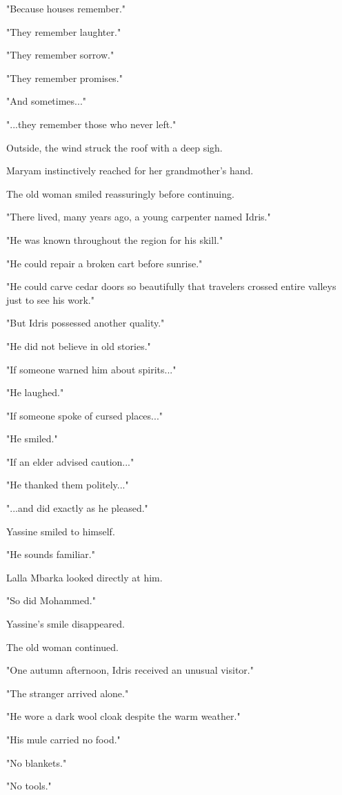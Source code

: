 \documentclass[12pt,openany]{book}
\begin{document}
"Because houses remember."

"They remember laughter."

"They remember sorrow."

"They remember promises."

"And sometimes..."

"...they remember those who never left."

Outside, the wind struck the roof with a deep sigh.

Maryam instinctively reached for her grandmother's hand.

The old woman smiled reassuringly before continuing.

"There lived, many years ago, a young carpenter named Idris."

"He was known throughout the region for his skill."

"He could repair a broken cart before sunrise."

"He could carve cedar doors so beautifully that travelers crossed entire valleys just to see his work."

"But Idris possessed another quality."

"He did not believe in old stories."

"If someone warned him about spirits..."

"He laughed."

"If someone spoke of cursed places..."

"He smiled."

"If an elder advised caution..."

"He thanked them politely..."

"...and did exactly as he pleased."

Yassine smiled to himself.

"He sounds familiar."

Lalla Mbarka looked directly at him.

"So did Mohammed."

Yassine's smile disappeared.

The old woman continued.

"One autumn afternoon, Idris received an unusual visitor."

"The stranger arrived alone."

"He wore a dark wool cloak despite the warm weather."

"His mule carried no food."

"No blankets."

"No tools."
\end{document}
